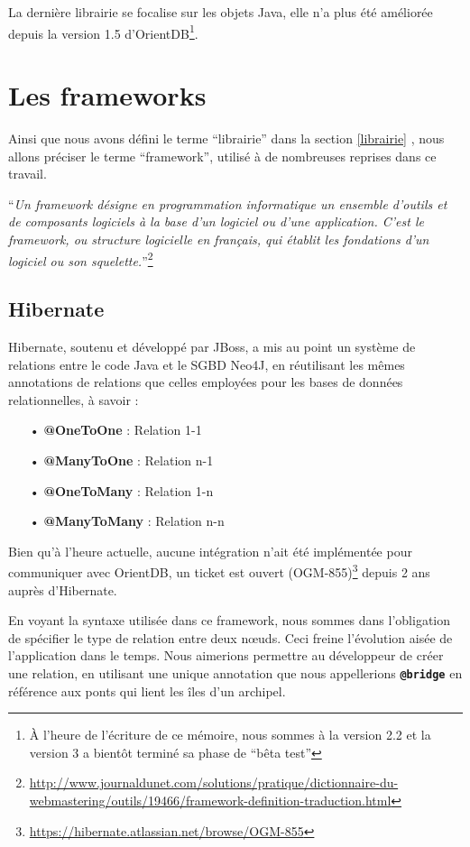\documentclass[a4paper,fleqn,12pt,oneside]{book}
\begin{document}
La dernière librairie se focalise sur les objets Java, elle n'a plus été améliorée depuis la version 1.5 d'OrientDB\footnote{À l'heure de l'écriture de ce mémoire, nous sommes à la version 2.2 et la version 3 a bientôt terminé sa phase de \enquote{bêta test}}.
\newpage
\section{Les frameworks}

Ainsi que nous avons défini le terme \enquote{librairie} dans la section \ref{librairie} , nous allons préciser le terme \enquote{framework}, utilisé à de nombreuses reprises dans ce travail.

\enquote{\textit{Un framework désigne en programmation informatique un ensemble d'outils et de composants logiciels à la base d'un logiciel ou d'une application. C'est le framework, ou structure logicielle en français, qui établit les fondations d'un logiciel ou son squelette.}}\footnote{\url{http://www.journaldunet.com/solutions/pratique/dictionnaire-du-webmastering/outils/19466/framework-definition-traduction.html}}


\subsection{Hibernate}

Hibernate, soutenu et développé par JBoss, a mis au point un système de relations entre le code Java et le SGBD Neo4J, en réutilisant les mêmes annotations de relations que celles employées pour les bases de données relationnelles, à savoir :

\begin{itemize}
\item[•] \textbf{@OneToOne} : Relation 1-1
\item[•] \textbf{@ManyToOne} : Relation n-1
\item[•] \textbf{@OneToMany} : Relation 1-n
\item[•] \textbf{@ManyToMany} : Relation n-n
\end{itemize}

Bien qu'à l'heure actuelle, aucune intégration n'ait été implémentée pour communiquer avec OrientDB, un ticket est ouvert (OGM-855)\footnote{\url{https://hibernate.atlassian.net/browse/OGM-855}} depuis 2 ans auprès d'Hibernate.

En voyant la syntaxe utilisée dans ce framework, nous sommes dans l'obligation de spécifier le type de relation entre deux nœuds. Ceci freine l'évolution aisée de l'application dans le temps. Nous aimerions permettre au développeur de créer une relation, en utilisant une unique annotation que nous appellerions \textbf{\texttt{@bridge}} en référence aux ponts qui lient les îles d'un archipel. \label{bridge}
\end{document}
